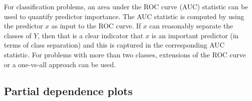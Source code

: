 \documentclass[12pt]{article}
\begin{document}
For classification problems, an area under the ROC curve (AUC) statistic can be used to quantify predictor importance. The AUC statistic is computed by using the predictor $x$ as input to the ROC curve. If $x$ can reasonably separate the classes of $Y$, then that is a clear indicator that $x$ is an important predictor (in terms of class separation) and this is captured in the corresponding AUC statistic. For problems with more than two classes, extensions of the ROC curve or a one-vs-all approach can be used.


\subsection{Partial dependence plots}

\end{document}
